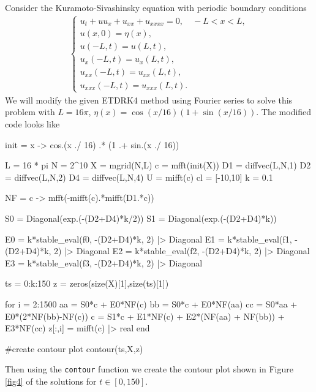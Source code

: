 \documentclass[12pt]{report}
\begin{document}
\begin{solution}
    
    \noindent
    Consider the Kuramoto-Sivashinsky equation with periodic boundary conditions
    \begin{align*}
        \begin{cases} u_t + u u_x + u_{xx} + u_{xxxx} = 0, \quad -L < x <L,\\
          u(x,0) = \eta(x),\\
          u(-L,t) = u(L,t),\\
          u_x(-L,t) = u_x(L,t),\\
          u_{xx}(-L,t) = u_{xx}(L,t),\\
          u_{xxx}(-L,t) = u_{xxx}(L,t).
        \end{cases}
     \end{align*}
     We will modify the given ETDRK4 method using Fourier series to solve this problem with $L=16\pi$, $\eta(x) = \cos(x/16)(1 + \sin(x/16))$. The modified code looks like
     \begin{python}
init = x ->  cos.(x ./ 16) .* (1 .+ sin.(x ./ 16))

L = 16 * pi
N = 2^10
X = mgrid(N,L)
c = mfft(init(X))
D1 = diffvec(L,N,1)
D2 = diffvec(L,N,2)
D4 = diffvec(L,N,4)
U = mifft(c)
cl = [-10,10]
k = 0.1

NF = c -> mfft(-mifft(c).*mifft(D1.*c))

S0 = Diagonal(exp.(-(D2+D4)*k/2))
S1 = Diagonal(exp.(-(D2+D4)*k))

E0 = k*stable_eval(f0, -(D2+D4)*k, 2) |> Diagonal
E1 = k*stable_eval(f1, -(D2+D4)*k, 2) |> Diagonal
E2 = k*stable_eval(f2, -(D2+D4)*k, 2) |> Diagonal
E3 = k*stable_eval(f3, -(D2+D4)*k, 2) |> Diagonal

ts = 0:k:150
z = zeros(size(X)[1],size(ts)[1])

for i = 2:1500
    aa = S0*c + E0*NF(c)
    bb = S0*c + E0*NF(aa)
    cc = S0*aa + E0*(2*NF(bb)-NF(c))
    c = S1*c + E1*NF(c) + E2*(NF(aa) + NF(bb)) + E3*NF(cc)
    z[:,i] = mifft(c) |> real
end

#create contour plot
contour(ts,X,z)
     \end{python}
     Then using the \verb+contour+ function we create the contour plot shown in Figure \ref{fig4} of the solutions for $t\in[0,150]$.
     

\end{solution}
\end{document}
